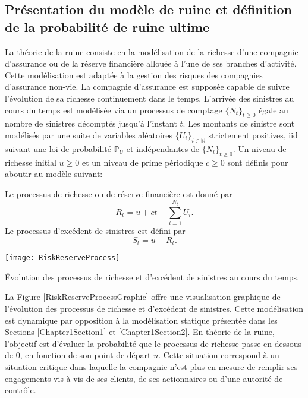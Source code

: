 \subsection{Présentation du modèle de ruine et définition de la probabilité de ruine ultime}
La théorie de la ruine consiste en la modélisation de la richesse d'une compagnie d'assurance ou de la réserve financière allouée à l'une de ses branches d'activité. Cette modélisation est adaptée à la gestion des risques des compagnies d'assurance non-vie. La compagnie d'assurance est supposée capable de suivre l'évolution de sa richesse continuement dans le temps. L'arrivée des sinistres au cours du temps est modélisée via un processus de comptage $\{N_{t}\}_{t\geq0}$ égale au nombre de sinistres décomptés jusqu'à l'instant $t$. Les montants de sinistre sont modélisés par une suite de variables aléatoires $\{U_{i}\}_{i\in\mathbb{N}}$ strictement positives, \gls{iid} suivant une loi de probabilité $\mathbb{P}_{U}$ et indépendantes de $\{N_{t}\}_{t\geq0}$. Un niveau de richesse initial $u\geq0$ et un niveau de prime périodique $c\geq0$ sont définis pour aboutir au modèle suivant: 
\begin{Mod}\label{RiskReserveProcess}
Le processus de richesse ou de réserve financière est donné par 
\begin{equation}\label{ReserveProcess}
R_{t}=u+ct-\sum_{i=1}^{N_{t}}U_{i}.
\end{equation}
Le processus d'excédent de sinistres est défini par 
\begin{equation}\label{SurplusProcess}
S_{t}=u-R_{t}.
\end{equation}
\end{Mod}
	\begin{figureth}
			\texttt{[image: RiskReserveProcess]}
			\caption{\'Evolution des processus de richesse et d'excédent de sinistres au cours du temps.}
				\label{RiskReserveProcessGraphic}
	\end{figureth}
La Figure \ref{RiskReserveProcessGraphic} offre une visualisation graphique de l'évolution des processus de richesse et d'excédent de sinistres. Cette modélisation est dynamique par opposition à la modélisation statique présentée dans les Sections \ref{Chapter1Section1} et \ref{Chapter1Section2}. En théorie de la ruine, l'objectif est d'évaluer la probabilité que le processus de richesse passe en dessous de $0$, en fonction de son point de départ $u$. Cette situation correspond à un situation critique dans laquelle la compagnie n'est plus en mesure de remplir ses engagements vis-à-vis de ses clients, de ses actionnaires ou d'une autorité de contrôle. 
